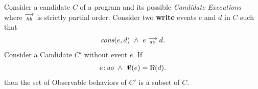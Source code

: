 

\begin{theorem}
    \label{WriteElim}
    Consider a candidate $C$ of a program and its possible \textit{Candidate Executions} where $\stackrel{\longrightarrow}{_\textit{hb}}$ is strictly partial order. 
    Consider two \textbf{write} events $e$ and $d$ in $C$ such that 
    \begin{align*}
        \textit{cons}(e,d) \ \wedge \ e\stackrel{\longrightarrow}{_{ao}}d. 
    \end{align*}
    Consider a Candidate $C'$ without event $e$.  
    If
    \begin{align*}
        e\!:\!\textit{uo} \ \wedge \ \Re(e) = \Re(d). 
    \end{align*}
    then the set of Observable behaviors of $C'$ is a subset of $C$.  
\end{theorem}